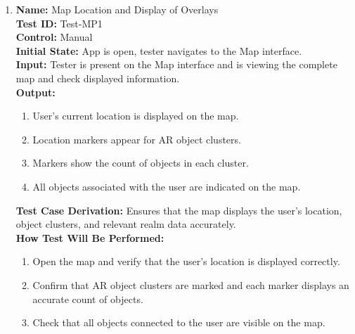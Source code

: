 \documentclass[12pt, titlepage]{article}
\begin{document}
\begin{enumerate}

  \item \textbf{Name:} Map Location and Display of Overlays \label{itm:Test-MP1} \\
        \textbf{Test ID:} Test-MP1 \\
        \textbf{Control:} Manual \\
        \textbf{Initial State:} App is open, tester navigates to the Map interface. \\
        \textbf{Input:} Tester is present on the Map interface and is viewing the complete map and check displayed information. \\
        \textbf{Output:}
        \begin{enumerate}
          \item User's current location is displayed on the map.
          \item Location markers appear for AR object clusters.
          \item Markers show the count of objects in each cluster.
          \item All objects associated with the user are indicated on the map.
        \end{enumerate}
        \textbf{Test Case Derivation:} Ensures that the map displays the user's location, object clusters, and relevant realm data accurately. \\
        \textbf{How Test Will Be Performed:}
        \begin{enumerate}
          \item Open the map and verify that the user's location is displayed correctly.
          \item Confirm that AR object clusters are marked and each marker displays an accurate count of objects.
          \item Check that all objects connected to the user are visible on the map.
        \end{enumerate}


\end{enumerate}
\end{document}

